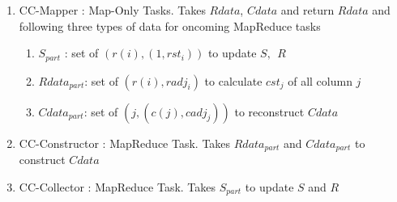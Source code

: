 \documentclass[10pt]{article}
\begin{document}
	\begin{enumerate}
		\item CC-Mapper : Map-Only Tasks. Takes $Rdata$, $Cdata$ and return $Rdata$ and following three types of data for oncoming MapReduce tasks
		\begin{enumerate}
			\item $S_{part}$ : set of $(r(i),(1,rst_i))$ to update $S,\ \ R$
			\item $Rdata_{part}$: set of $(r(i),radj_i)$ to calculate $cst_j$ of all column $j$
			\item $Cdata_{part}$: set of $(j,(c(j),cadj_j))$ to reconstruct $Cdata$
		\end{enumerate}
		\item CC-Constructor : MapReduce Task. Takes $Rdata_{part}$ and $Cdata_{part}$ to construct $Cdata$
		\item CC-Collector : MapReduce Task. Takes $S_{part}$ to update $S$ and $R$
	\end{enumerate}
	
\end{document}
